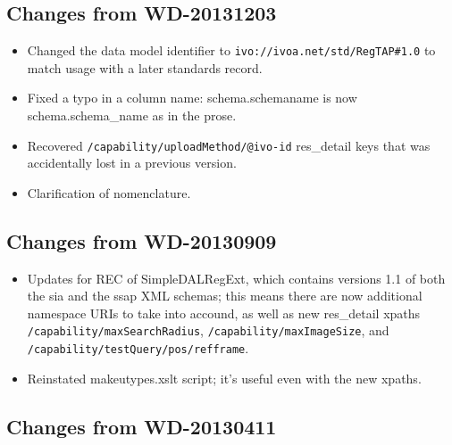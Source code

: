 \documentclass[11pt,a4paper]{ivoa}
\begin{document}
\subsection{Changes from WD-20131203}

\label{changes-20131203}


\begin{itemize}

\item Changed the data model identifier to
  \texttt{ivo://ivoa.net/std/RegTAP\#1.0} to match usage with a
  later standards record.{}

\item Fixed a typo in a column name: schema.schemaname is now schema.schema\_name
  as in the prose.{}

\item Recovered 
  \texttt{/capability/uploadMethod/@ivo-id} res\_detail keys that was
  accidentally lost in a previous version.{}

\item Clarification of nomenclature.{}

\end{itemize}

\subsection{Changes from WD-20130909}

\label{changes-20130909}


\begin{itemize}

\item Updates for REC of SimpleDALRegExt, which contains versions 1.1 of
  both the sia and the ssap XML schemas; this means there are now additional
  namespace URIs to take into accound, as well as new res\_detail xpaths
  \texttt{/capability/maxSearchRadius}, 
  \texttt{/capability/maxImageSize}, and 
  \texttt{/capability/testQuery/pos/refframe}.{}

\item Reinstated makeutypes.xslt script; it's useful even with the new
  xpaths.{}

\end{itemize}

\subsection{Changes from WD-20130411}

\label{changes-20130411}
\end{document}
